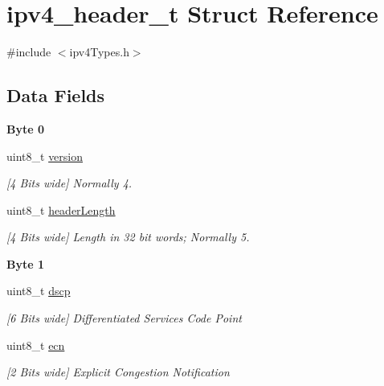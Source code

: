 \hypertarget{structipv4__header__t}{}\section{ipv4\+\_\+header\+\_\+t Struct Reference}
\label{structipv4__header__t}


{\ttfamily \#include $<$ipv4\+Types.\+h$>$}

\subsection*{Data Fields}
\begin{Indent}\textbf{ Byte 0}\par
\begin{DoxyCompactItemize}
\item 
uint8\+\_\+t \mbox{\hyperlink{structipv4__header__t_ab22abc2906422da61885ac6c8e6a1a59}{version}}
\begin{DoxyCompactList}\small\item\em \mbox{[}4 Bits wide\mbox{]} Normally 4. \end{DoxyCompactList}\item 
uint8\+\_\+t \mbox{\hyperlink{structipv4__header__t_abf2b1d816d4e2e459b2ed1bda26cb904}{header\+Length}}
\begin{DoxyCompactList}\small\item\em \mbox{[}4 Bits wide\mbox{]} Length in 32 bit words; Normally 5. \end{DoxyCompactList}\end{DoxyCompactItemize}
\end{Indent}
\begin{Indent}\textbf{ Byte 1}\par
\begin{DoxyCompactItemize}
\item 
uint8\+\_\+t \mbox{\hyperlink{structipv4__header__t_af6c1c78d408e91d2916add663a491623}{dscp}}
\begin{DoxyCompactList}\small\item\em \mbox{[}6 Bits wide\mbox{]} Differentiated Services Code Point \end{DoxyCompactList}\item 
uint8\+\_\+t \mbox{\hyperlink{structipv4__header__t_afaf0e7ded50820ba5d7d11464707ce4c}{ecn}}
\begin{DoxyCompactList}\small\item\em \mbox{[}2 Bits wide\mbox{]} Explicit Congestion Notification \end{DoxyCompactList}\end{DoxyCompactItemize}
\end{Indent}

